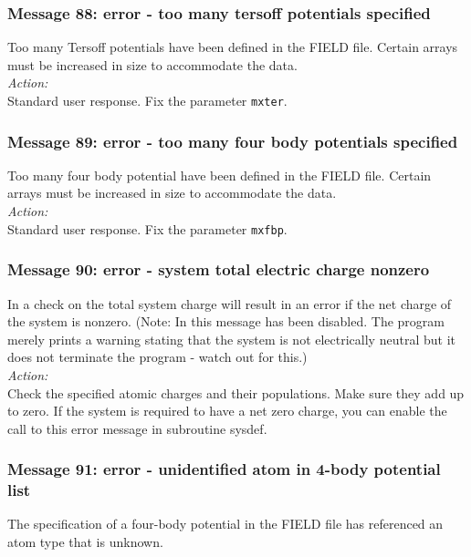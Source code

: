 \subsubsection*{Message 88: error - too many tersoff potentials specified}

Too many Tersoff potentials  have been defined in the FIELD file.
Certain arrays must be increased in size to accommodate the data.\\

\noindent
{\em Action:}\\
Standard user response. Fix the parameter {\tt mxter}.

\subsubsection*{Message 89: error - too many four body potentials
specified}

Too many four body potential  have been defined in the FIELD file.
Certain arrays must be increased in size to accommodate the data.\\

\noindent
{\em Action:}\\
Standard user response. Fix the parameter {\tt mxfbp}.

\subsubsection*{Message 90: error - system total electric charge nonzero}

In \D{} a check on the total system charge will
result in an error if the net charge of the system is nonzero.  (Note:
In \D{}  this message has been disabled. The program
merely prints a warning stating that the system is not electrically neutral 
but it does not terminate the program - watch out for this.) \\  

\noindent
{\em Action:} \\ 
Check the specified atomic charges and their populations. Make sure
they add up to zero. If the system is required to have a net zero charge,
you can enable the call to this error message in subroutine {\sc sysdef}.

\subsubsection*{Message 91: error - unidentified atom in 4-body
potential list}

The specification of a four-body  potential in the FIELD file has
referenced an atom type that is unknown.\\

